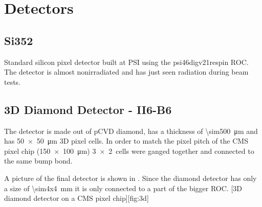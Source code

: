 \section{Detectors}

\subsection{Si352}

Standard silicon pixel detector built at \ac{PSI} using the psi46digv21respin \ac{ROC}. The detector is almost nonirradiated and has just seen radiation during beam tests.

\subsection{3D Diamond Detector - II6-B6}

The detector is made out of \ac{pCVD} diamond, has a thickness of \SI{\sim500}{\micro\meter} and has \SI{50x50}{\micro\meter} 3D pixel cells. In order to match the pixel pitch of the CMS pixel chip (\SI{150x100}{\micro\meter}) \SI{3x2}{cells} were ganged together and connected to the same bump bond.\par
A picture of the final detector is shown in . Since the diamond detector has only a size of \SI{\sim4x4}{\mm} it is only connected to a part of the bigger \ac{ROC}. 
[3D diamond detector on a CMS pixel chip][fig:3d]




